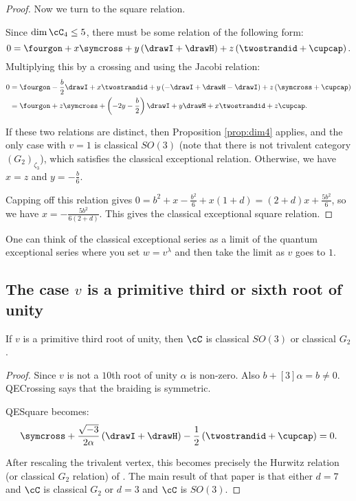 \documentclass[12pt]{amsart}
\begin{document}
\begin{proof}
Now we turn to the square relation.

Since $\dim \cC_4 \leq 5$, there must be some relation of the following form:
$$0 = \fourgon + x \symcross + y \left(\drawI + \drawH \right) + z\left(\twostrandid + \cupcap \right).$$
Multiplying this by a crossing and using the Jacobi relation:
\begin{align*}
0 &= \fourgon - \frac{b}{2} \drawI + x \twostrandid + y \left(-\drawI + \drawH -\drawI \right) + z\left(\symcross + \cupcap \right) 
\\ &= \fourgon + z \symcross + \left(-2y -\frac{b}{2} \right) \drawI +y \drawH +x \twostrandid + z\cupcap. 
\end{align*}

If these two relations are distinct, then Proposition \ref{prop:dim4} applies, and the only case with $v=1$ is classical $SO(3)$ (note that there is not trivalent category $(G_2)_{\zeta_3}$), which satisfies the classical exceptional relation.  Otherwise, we have $x=z$ and $y = -\frac{b}{6}$.  

Capping off this relation gives $0 = b^2 + x -\frac{b^2}{6}+x(1+d) =  (2+d)x +\frac{5 b^2}{6}$, so we have $x = -\frac{5 b^2}{6(2+d)}$.  This gives the classical exceptional square relation.
\end{proof}

\begin{remark}
One can think of the classical exceptional series as a limit of the quantum exceptional series where you set $w = v^\lambda$ and then take the limit as $v$ goes to $1$.
\end{remark}

\subsection{The case \texorpdfstring{$v$}{v} is a primitive third or sixth root of unity}

\begin{proposition}
If $v$ is a primitive third root of unity, then $\cC$ is classical $SO(3)$ or classical $G_2$.
\end{proposition}
\begin{proof}
Since $v$ is not a $10$th root of unity $\alpha$ is non-zero.  Also $b+[3]\alpha = b \neq 0$.  QECrossing says that the braiding is symmetric.  

QESquare becomes:
$$\symcross+\frac{\sqrt{-3}}{2\alpha} \left(\drawI + \drawH \right) -\frac{1}{2} \left(\twostrandid + \cupcap \right) = 0.$$

After rescaling the trivalent vertex, this becomes precisely the Hurwitz relation (or classical $G_2$ relation) of \cite{1011.6197}.  The main result of that paper is that either $d = 7$ and $\cC$ is classical $G_2$ or $d=3$ and $\cC$ is $SO(3)$.
\end{proof}
\end{document}
